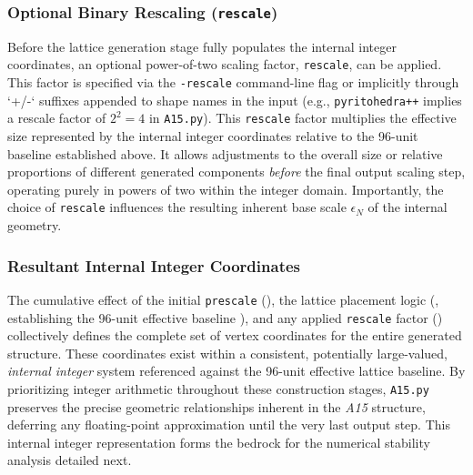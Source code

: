 \documentclass[10pt]{article}
\def\AAAB{\textit{A15}}
\begin{document}
\subsubsection{Optional Binary Rescaling (\texttt{rescale})}\label{subsubsec-scaling-rescale}
Before the lattice generation stage fully populates the internal integer coordinates, an optional power-of-two scaling factor, \texttt{rescale}, can be applied. This factor is specified via the \texttt{-rescale} command-line flag or implicitly through `+/-` suffixes appended to shape names in the input (e.g., \texttt{pyritohedra++} implies a rescale factor of $2^2=4$ in \texttt{A15.py}). This \texttt{rescale} factor multiplies the effective size represented by the internal integer coordinates relative to the 96-unit baseline established above. It allows adjustments to the overall size or relative proportions of different generated components \emph{before} the final output scaling step, operating purely in powers of two within the integer domain. Importantly, the choice of \texttt{rescale} influences the resulting inherent base scale $\epsilon_N$ of the internal geometry.

\subsubsection{Resultant Internal Integer Coordinates}\label{subsubsec-scaling-internal}
The cumulative effect of the initial \texttt{prescale} (), the lattice placement logic (, establishing the 96-unit effective baseline ), and any applied \texttt{rescale} factor () collectively defines the complete set of vertex coordinates for the entire generated structure. These coordinates exist within a consistent, potentially large-valued, \emph{internal integer} system referenced against the 96-unit effective lattice baseline. By prioritizing integer arithmetic throughout these construction stages, \texttt{A15.py} preserves the precise geometric relationships inherent in the \AAAB{} structure, deferring any floating-point approximation until the very last output step. This internal integer representation forms the bedrock for the numerical stability analysis detailed next.
\end{document}
